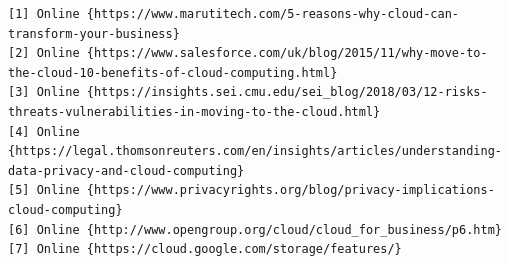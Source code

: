 \documentclass[journal]{hybrid-cloud}
\begin{document}
\begin{verbatim}
[1] Online {https://www.marutitech.com/5-reasons-why-cloud-can-transform-your-business}
[2] Online {https://www.salesforce.com/uk/blog/2015/11/why-move-to-the-cloud-10-benefits-of-cloud-computing.html}
[3] Online {https://insights.sei.cmu.edu/sei_blog/2018/03/12-risks-threats-vulnerabilities-in-moving-to-the-cloud.html}
[4] Online {https://legal.thomsonreuters.com/en/insights/articles/understanding-data-privacy-and-cloud-computing}
[5] Online {https://www.privacyrights.org/blog/privacy-implications-cloud-computing}
[6] Online {http://www.opengroup.org/cloud/cloud_for_business/p6.htm}
[7] Online {https://cloud.google.com/storage/features/}
\end{verbatim}





%
%
%








\begin{thebibliography}{1}




\end{thebibliography}

% 
\end{document}
